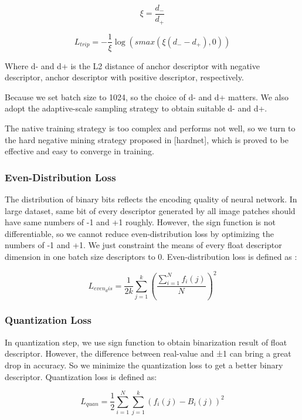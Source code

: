 \documentclass[letterpaper, 10 pt, conference]{ieeeconf}  %
\begin{document}
\begin{equation}
\xi  = \frac{d _{-}}{d _{+}}
\end{equation}

\begin{equation}
L_{trip}  = - \frac{1}{\xi}\log (smax(\xi( d _{-} - d _{+}  ) , 0)) 
\end{equation}

Where d- and d+ is the L2 distance of anchor descriptor with negative descriptor, anchor descriptor with positive descriptor, respectively. 

Because we set batch size to 1024, so the choice of d- and d+ matters. We also adopt the adaptive-scale sampling strategy to obtain suitable d- and d+.

The native training strategy is too complex and performs not well, so we turn to the hard negative mining strategy proposed in [hardnet], which is proved to be effective and easy to converge in training. 

\subsubsection{Even-Distribution Loss} 
The distribution of binary bits reflects the encoding quality of neural network. In large dataset, same bit of every descriptor generated by all image patches should have same numbers of -1 and +1 roughly. However, the sign function is not differentiable, so we cannot reduce even-distribution loss by optimizing the numbers of -1 and +1. We just constraint the means of every float descriptor dimension in one batch size descriptors to 0. Even-distribution loss is defined as :

\begin{equation}
L_{even_dis}  =  \frac{1}{2k}\sum\limits_{j=1}^{k}\left(\frac{\sum\limits_{i=1}^{N}f_i(j)}{N}\right )^2
\end{equation}


\subsubsection{Quantization Loss} 
In quantization step, we use sign function to obtain binarization result of float descriptor. However, the difference between real-value and ±1 can bring a great drop in accuracy. So we minimize the quantization loss to get a better binary descriptor. Quantization loss is defined as:

\begin{equation}
L_{quan}  =  \frac{1}{2}\sum\limits_{i=1}^{N} \sum\limits_{j=1}^{k} \left(f_i(j)-B_i(j) \right )^2
\end{equation}
\end{document}
